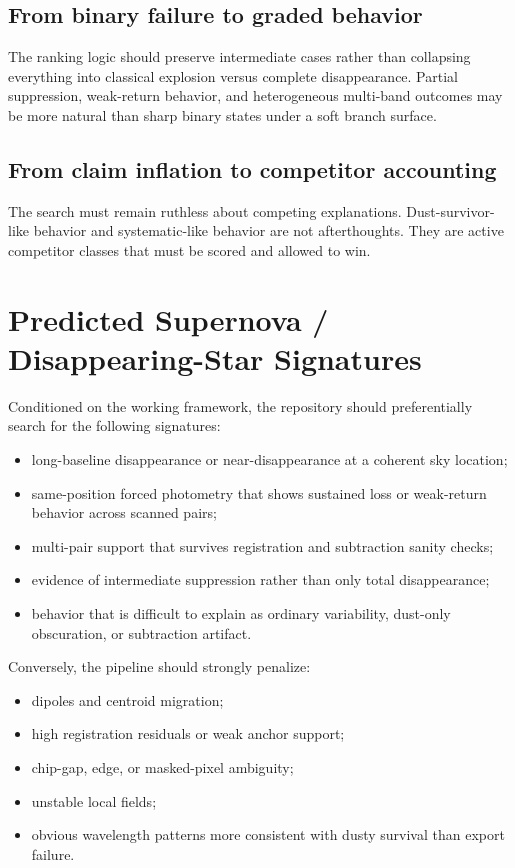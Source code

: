 \documentclass[11pt]{article}
\begin{document}
\subsection*{From binary failure to graded behavior}
The ranking logic should preserve intermediate cases rather than collapsing everything into classical explosion versus complete disappearance. Partial suppression, weak-return behavior, and heterogeneous multi-band outcomes may be more natural than sharp binary states under a soft branch surface.

\subsection*{From claim inflation to competitor accounting}
The search must remain ruthless about competing explanations. Dust-survivor-like behavior and systematic-like behavior are not afterthoughts. They are active competitor classes that must be scored and allowed to win.

\section{Predicted Supernova / Disappearing-Star Signatures}

Conditioned on the working framework, the repository should preferentially search for the following signatures:
\begin{itemize}[leftmargin=1.5em]
\item long-baseline disappearance or near-disappearance at a coherent sky location;
\item same-position forced photometry that shows sustained loss or weak-return behavior across scanned pairs;
\item multi-pair support that survives registration and subtraction sanity checks;
\item evidence of intermediate suppression rather than only total disappearance;
\item behavior that is difficult to explain as ordinary variability, dust-only obscuration, or subtraction artifact.
\end{itemize}

Conversely, the pipeline should strongly penalize:
\begin{itemize}[leftmargin=1.5em]
\item dipoles and centroid migration;
\item high registration residuals or weak anchor support;
\item chip-gap, edge, or masked-pixel ambiguity;
\item unstable local fields;
\item obvious wavelength patterns more consistent with dusty survival than export failure.
\end{itemize}
\end{document}
